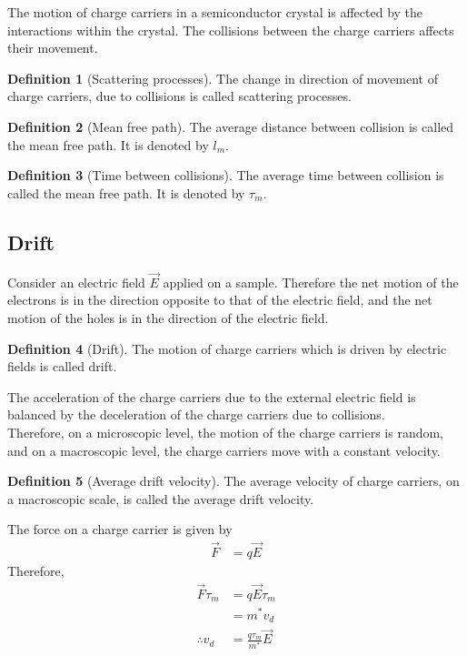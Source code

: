 \documentclass[titlepage, fleqn, a4paper, 12pt, twoside]{article}
\theoremstyle{definition}
\newtheorem{definition}{Definition}
\theoremstyle{theorem}
\begin{document}
The motion of charge carriers in a semiconductor crystal is affected by the interactions within the crystal.
The collisions between the charge carriers affects their movement.

\begin{definition}[Scattering processes]
	The change in direction of movement of charge carriers, due to collisions is called scattering processes.
\end{definition}

\begin{definition}[Mean free path]
	The average distance between collision is called the mean free path.
	It is denoted by $l_m$.
\end{definition}

\begin{definition}[Time between collisions]
	The average time between collision is called the mean free path.
	It is denoted by $\tau_m$.
\end{definition}

\subsection{Drift}

Consider an electric field $\overrightarrow{E}$ applied on a sample.
Therefore the net motion of the electrons is in the direction opposite to that of the electric field, and the net motion of the holes is in the direction of the electric field.

\begin{definition}[Drift]
	The motion of charge carriers which is driven by electric fields is called drift.
\end{definition}

The acceleration of the charge carriers due to the external electric field is balanced by the deceleration of the charge carriers due to collisions.\\
Therefore, on a microscopic level, the motion of the charge carriers is random, and on a macroscopic level, the charge carriers move with a constant velocity.
\begin{definition}[Average drift velocity]
	The average velocity of charge carriers, on a macroscopic scale, is called the average drift velocity.
\end{definition}

The force on a charge carrier is given by
\begin{align*}
	\overrightarrow{F} &= q \overrightarrow{E}
\end{align*}
Therefore,
\begin{align*}
	\overrightarrow{F} \tau_m &= q \overrightarrow{E} \tau_m\\
	&= m^* v_d\\
	\therefore v_d &= \frac{q \tau_m}{m^*} \overrightarrow{E}
\end{align*}
\end{document}
